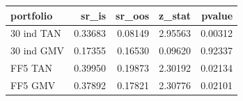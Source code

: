 \begin{tabular}{lrrrr}
\toprule
portfolio & sr\_is & sr\_oos & z\_stat & pvalue \\
\midrule
30 ind TAN & 0.33683 & 0.08149 & 2.95563 & 0.00312 \\
30 ind GMV & 0.17355 & 0.16530 & 0.09620 & 0.92337 \\
FF5 TAN & 0.39950 & 0.19873 & 2.30192 & 0.02134 \\
FF5 GMV & 0.37892 & 0.17821 & 2.30776 & 0.02101 \\
\bottomrule
\end{tabular}
